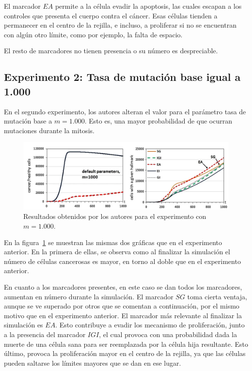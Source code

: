 El marcador $EA$ permite a la célula evadir la apoptosis, las cuales escapan
a los controles que presenta el cuerpo contra el cáncer. Esas células tienden a
permanecer en el centro de la rejilla, e incluso, a proliferar si no se encuentran con
algún otro límite, como por ejemplo, la falta de espacio.

El resto de marcadores no tienen presencia o su número es despreciable.

\subsection{Experimento 2: Tasa de mutación base igual a 1.000}

En el segundo experimento, los autores alteran el valor para el parámetro tasa de
mutación base a $m=1.000$. Esto es, una mayor probabilidad de que ocurran mutaciones
durante la mitosis.

\begin{figure}[h]
\centering
\includegraphics[scale=0.6]{figures/experiments/exp2}
\caption{Resultados obtenidos por los autores para el experimento con $m=1.000$.}
\label{fig:exp2}
\end{figure}

En la figura~\ref{fig:exp2} se muestran las mismas dos gráficas que en el experimento anterior.
En la primera de ellas, se observa como al finalizar la simulación el número de células
cancerosas es mayor, en torno al doble que en el experimento anterior.

\clearpage

En cuanto a los marcadores presentes, en este caso se dan todos los marcadores, aumentan en
número durante la simulación. El marcador $SG$ toma cierta ventaja, aunque se ve superado por
otros que se comentan a continuación, por el mismo motivo que en el experimento anterior. El
marcador más relevante al finalizar la simulación es $EA$. Esto contribuye a evadir
los mecanismo de proliferación, junto a la presencia del marcador $IGI$, el cual
provoca con una probabilidad dada la muerte de una célula sana para ser reemplazada por
la célula hija resultante. Esto último, provoca la proliferación mayor en el centro
de la rejilla, ya que las células pueden saltarse los límites mayores que se dan en ese lugar.

